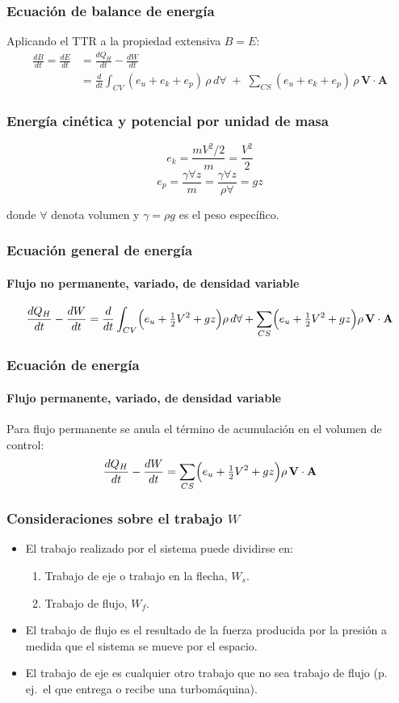 \documentclass{ltx-talk}
\begin{document}
\begin{frame}
  \frametitle{Ecuación de balance de energía}
  Aplicando el TTR a la propiedad extensiva $B = E$:
  \begin{align*}
    \frac{dB}{dt} = \frac{dE}{dt} &= \frac{dQ_H}{dt} - \frac{dW}{dt} \\
      &= \frac{d}{dt}\int_{CV} (e_u+e_k+e_p)\,\rho\,d\forall
         \;+\; \sum_{CS} (e_u+e_k+e_p)\,\rho\,\mathbf{V}\cdot\mathbf{A}
  \end{align*}
\end{frame}

\begin{frame}
  \frametitle{Energía cinética y potencial por unidad de masa}
  \[
    e_k = \frac{mV^2/2}{m} = \frac{V^2}{2}
  \]
  \vspace{1em}
  \[
    e_p = \frac{\gamma \forall z}{m} = \frac{\gamma \forall z}{\rho \forall} = gz
  \]
  \vspace{0.5em}

  donde $\forall$ denota volumen y $\gamma = \rho g$ es el peso
  específico.
\end{frame}

\begin{frame}
  \frametitle{Ecuación general de energía}
  \framesubtitle{Flujo no permanente, variado, de densidad variable}
  \[
    \frac{dQ_H}{dt} - \frac{dW}{dt}
      = \frac{d}{dt}\int_{CV}\Bigl(e_u+\tfrac{1}{2}V^2+gz\Bigr)\rho\,d\forall
        + \sum_{CS}\Bigl(e_u+\tfrac{1}{2}V^2+gz\Bigr)\rho\,\mathbf{V}\cdot\mathbf{A}
  \]
\end{frame}

\begin{frame}
  \frametitle{Ecuación de energía}
  \framesubtitle{Flujo permanente, variado, de densidad variable}
  Para flujo permanente se anula el término de acumulación en el
  volumen de control:
  \[
    \frac{dQ_H}{dt} - \frac{dW}{dt}
      = \sum_{CS}\Bigl(e_u+\tfrac{1}{2}V^2+gz\Bigr)\rho\,\mathbf{V}\cdot\mathbf{A}
  \]
\end{frame}

\begin{frame}
  \frametitle{Consideraciones sobre el trabajo $W$}
  \begin{itemize}
    \item El trabajo realizado por el sistema puede dividirse en:
    \begin{enumerate}
      \item Trabajo de eje o trabajo en la flecha, $W_s$.
      \item Trabajo de flujo, $W_f$.
    \end{enumerate}
    \item El trabajo de flujo es el resultado de la fuerza producida
      por la presión a medida que el sistema se mueve por el espacio.
    \item El trabajo de eje es cualquier otro trabajo que no sea
      trabajo de flujo (p.\,ej.\ el que entrega o recibe una turbomáquina).
  \end{itemize}
\end{frame}
\end{document}
